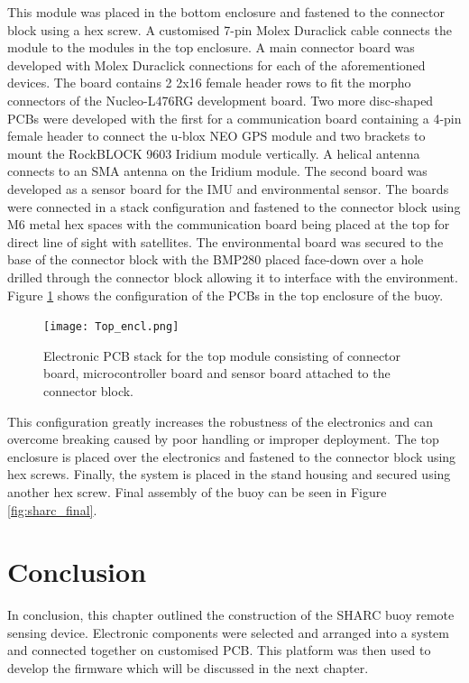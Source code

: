 This module was placed in the bottom enclosure and fastened to the connector block using a hex screw. A customised 7-pin Molex Duraclick cable connects the module to the modules in the top enclosure. A main connector board was developed with Molex Duraclick connections for each of the aforementioned devices. The board contains 2  2x16 female header rows to fit the morpho connectors of the Nucleo-L476RG development board. Two more disc-shaped PCBs were developed with the first for a communication board containing a 4-pin female header to connect the u-blox NEO GPS module and two brackets to mount the RockBLOCK 9603 Iridium module vertically. A helical antenna connects to an SMA antenna on the Iridium module. The second board was developed as a sensor board for the IMU and environmental sensor. The boards were connected in a stack configuration and fastened to the connector block using M6 metal hex spaces with the communication board being placed at the top for direct line of sight with satellites. The environmental board was secured to the base of the connector block with the BMP280 placed face-down over a hole drilled through the connector block allowing it to interface with the environment. Figure \ref{fig:top_elec} shows the configuration of the PCBs in the top enclosure of the buoy.
\begin{figure}[H]
	\centering
	\texttt{[image: Top\_encl.png]}
	\caption{Electronic PCB stack for the top module consisting of connector board, microcontroller board and sensor board attached to the connector block. }
	\label{fig:top_elec}
\end{figure}

This configuration greatly increases the robustness of the electronics and can overcome breaking caused by poor handling or improper deployment.  The top enclosure is placed over the electronics and fastened to the connector block using hex screws. Finally, the system is placed in the stand housing and secured using another hex screw. Final assembly of the buoy can be seen in Figure \ref{fig:sharc_final}.

\section{Conclusion}

In conclusion, this chapter outlined the construction of the SHARC buoy remote sensing device. Electronic components were selected and arranged into a system and connected together on customised PCB. This platform was then used to develop the firmware which will be discussed in the next chapter.
